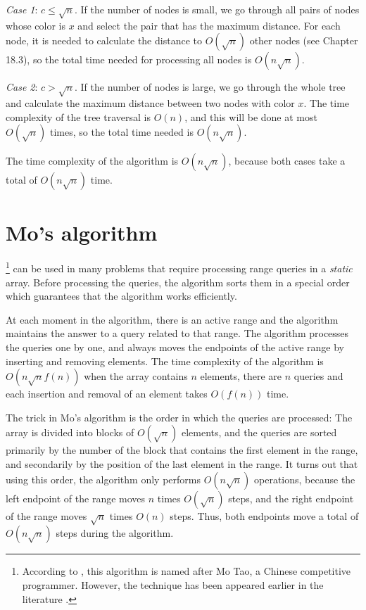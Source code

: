 \emph{Case 1}: $c \le \sqrt n$.
If the number of nodes is small,
we go through all pairs of nodes whose
color is $x$ and select the pair that
has the maximum distance.
For each node, it is needed to calculate the distance
to $O(\sqrt n)$ other nodes (see Chapter 18.3),
so the total time needed for processing all
nodes is $O(n \sqrt n)$.

\emph{Case 2}: $c > \sqrt n$.
If the number of nodes is large,
we go through the whole tree
and calculate the maximum distance between
two nodes with color $x$.
The time complexity of the tree traversal is $O(n)$,
and this will be done at most $O(\sqrt n)$ times,
so the total time needed is $O(n \sqrt n)$.

The time complexity of the algorithm is $O(n \sqrt n)$,
because both cases take a total of $O(n \sqrt n)$ time.

\section{Mo's algorithm}


 \footnote{According to \cite{cod15}, this algorithm
is named after Mo Tao, a Chinese competitive programmer. However,
the technique has been appeared earlier in the literature \cite{ken06}.} can be used in many problems
that require processing range queries in 
a \emph{static} array.
Before processing the queries, the algorithm
sorts them in a special order which guarantees
that the algorithm works efficiently.

At each moment in the algorithm, there is an active
range and the algorithm maintains the answer
to a query related to that range.
The algorithm processes the queries one by one,
and always moves the endpoints of the
active range by inserting and removing elements.
The time complexity of the algorithm is
$O(n \sqrt n f(n))$ when the array contains
$n$ elements, there are $n$ queries
and each insertion and removal of an element
takes $O(f(n))$ time.

The trick in Mo's algorithm is the order
in which the queries are processed:
The array is divided into blocks of $O(\sqrt n)$
elements, and the queries are sorted primarily by
the number of the block that contains the first element
in the range, and secondarily by the position of the
last element in the range.
It turns out that using this order, the algorithm
only performs $O(n \sqrt n)$ operations,
because the left endpoint of the range moves
$n$ times $O(\sqrt n)$ steps,
and the right endpoint of the range moves
$\sqrt n$ times $O(n)$ steps. Thus, both
endpoints move a total of $O(n \sqrt n)$ steps during the algorithm.

